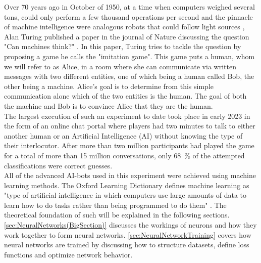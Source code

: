 Over 70 years ago in October of 1950, at a time when computers weighed several tons, could only perform a few thousand operations per second and the pinnacle of machine intelligence were analogous robots that could follow light sources \cite{FirstThinkingMachinesArticle}, Alan Turing published a paper in the journal of Nature discussing the question "Can machines think?" \cite{TuringThinkingPaper}. In this paper, Turing tries to tackle the question by proposing a game he calls the "imitation game". This game puts a human, whom we will refer to as Alice, in a room where she can communicate via written messages with two different entities, one of which being a human called Bob, the other being a machine. Alice's goal is to determine from this simple communication alone which of the two entities is the human. The goal of both the machine and Bob is to convince Alice that they are the human.\\
The largest execution of such an experiment to date took place in early 2023 in the form of an online chat portal where players had two minutes to talk to either another human or an Artificial Intelligence (AI) without knowing the type of their interlocutor. After more than two million participants had played the game for a total of more than 15 million conversations, only \SI{68}{\percent} of the attempted classifications were correct guesses.\\
All of the advanced AI-bots used in this experiment were achieved using machine learning methods. The Oxford Learning Dictionary defines machine learning as "type of artificial intelligence in which computers use large amounts of data to learn how to do tasks rather than being programmed to do them" \cite{MLDefinition}. The theoretical foundation of such will be explained in the following sections.\\
\cref{sec:NeuralNetworks(BigSection)} discusses the workings of neurons and how they work together to form neural networks. \cref{sec:NeuralNetworkTraining} covers how neural networks are trained by discussing how to structure datasets, define loss functions and optimize network behavior.
